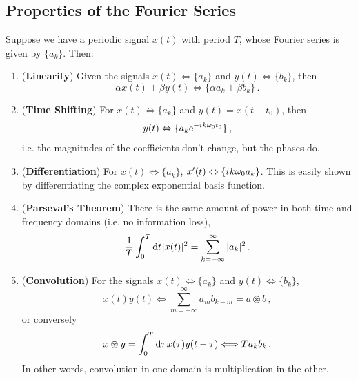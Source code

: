 \subsection{Properties of the Fourier Series}
%
Suppose we have a periodic signal $x(t)$ with period $T$, whose Fourier series is given by
$\{a_k\}$. Then:
%
\begin{enumerate}
\item (\textbf{Linearity}) Given the signals $x(t) \Leftrightarrow \{a_k\}$ and
  $y(t) \Leftrightarrow \{b_k\}$, then
  \begin{displaymath}
    \alpha x(t) + \beta y(t) \Leftrightarrow \{\alpha a_k + \beta b_k\} \,.
  \end{displaymath}
\item (\textbf{Time Shifting}) For $x(t) \Leftrightarrow \{a_k\}$ and
  $y(t) = x(t-t_0)$, then
  \begin{displaymath}
    y(t) \Leftrightarrow \{a_k\mathrm{e}^{-{i\mkern1mu} k\omega_0t_0}\} \,,
  \end{displaymath}
  i.e. the magnitudes of the coefficients don't change, but the phases do.
\item (\textbf{Differentiation}) For $x(t) \Leftrightarrow \{a_k\}$,
  $x^\prime(t) \Leftrightarrow \{{i\mkern1mu} k\omega_0 a_k\}$. This is easily shown by
  differentiating the complex exponential basis function.
\item (\textbf{Parseval's Theorem}) There is the same amount of power in both time
  and frequency domains (i.e. no information loss),
  \begin{displaymath}
    \frac{1}{T}\int_0^T \mathrm{d}t\mkern1mu |x(t)|^2 = \sum_{k=-\infty}^\infty |a_k|^2 \,.
  \end{displaymath}
\item (\textbf{Convolution}) For the signals $x(t) \Leftrightarrow \{a_k\}$ and
  $y(t) \Leftrightarrow \{b_k\}$,
  \begin{displaymath}
    x(t)y(t) \Longleftrightarrow \sum_{m=-\infty}^\infty a_m b_{k-m} = a \circledast b \,,
  \end{displaymath}
  or conversely
  \begin{displaymath}
    x\circledast y = \int_0^T \mathrm{d}\tau\mkern1mu x(\tau)y(t-\tau) \Longleftrightarrow Ta_kb_k \,.
  \end{displaymath}
  In other words, convolution in one domain is multiplication in the other. 
\end{enumerate}
